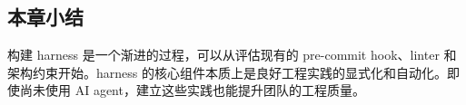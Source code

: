 \subsection{本章小结}

构建 harness 是一个渐进的过程，可以从评估现有的 pre-commit hook、linter 和架构约束开始。harness 的核心组件本质上是良好工程实践的显式化和自动化。即使尚未使用 AI agent，建立这些实践也能提升团队的工程质量。

\newpage

